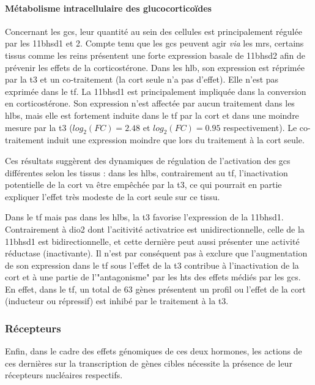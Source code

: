 \documentclass[../main.tex]{subfiles}
\begin{document}
\paragraph{Métabolisme intracellulaire des glucocorticoïdes}
Concernant les \glspl{gc}, leur quantité au sein des cellules est principalement régulée par les \gls{11bhsd1} et 2.
Compte tenu que les \glspl{gc} peuvent agir \textit{via} les \glspl{mr}, certains tissus comme les reins présentent une forte expression basale de \gls{11bhsd2} afin de prévenir les effets de la corticostérone.
Dans les \gls{hlb}, son expression est réprimée par la \gls{t3} et un co-traitement (la \gls{cort} seule n'a pas d'effet).
Elle n'est pas exprimée dans le \gls{tf}.
La \gls{11bhsd1} est principalement impliquée dans la conversion en corticostérone.
Son expression n'est affectée par aucun traitement dans les \glspl{hlb}, mais elle est fortement induite dans le \gls{tf} par la \gls{cort} et dans une moindre mesure par la \gls{t3} ($log_2(FC)=2.48$ et $log_2(FC)=0.95$ respectivement).
Le co-traitement induit une expression moindre que lors du traitement à la \gls{cort} seule.
\par
Ces résultats suggèrent des dynamiques de régulation de l'activation des \glspl{gc} différentes selon les tissus :
dans les \glspl{hlb}, contrairement au \gls{tf}, l'inactivation potentielle de la \gls{cort} va être empêchée par la \gls{t3}, ce qui pourrait en partie expliquer l'effet très modeste de la \gls{cort} seule sur ce tissu.
\par
Dans le \gls{tf} mais pas dans les \glspl{hlb}, la \gls{t3} favorise l'expression de la \gls{11bhsd1}.
Contrairement à \gls{dio2} dont l'acitivité activatrice est unidirectionnelle, celle de la \gls{11bhsd1} est bidirectionnelle, et cette dernière peut aussi présenter une activité réductase (inactivante).
Il n'est par conséquent pas à exclure que l'augmentation de son expression dans le \gls{tf} sous l'effet de la \gls{t3} contribue à l'inactivation de la \gls{cort} et à une partie de l'"antagonisme" par les \glspl{ht} des effets médiés par les \glspl{gc}.
En effet, dans le \gls{tf}, un total de 63 gènes présentent un profil ou l'effet de la \gls{cort} (inducteur ou répressif) est inhibé par le traitement à la \gls{t3}.

\subsubsection{Récepteurs}
Enfin, dans le cadre des effets génomiques de ces deux hormones, les actions de ces dernières sur la transcription de gènes cibles nécessite la présence de leur récepteurs nucléaires respectifs.
\end{document}
